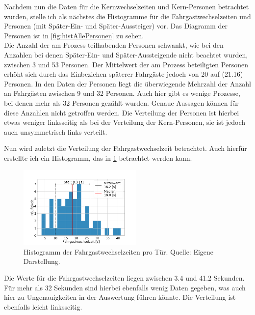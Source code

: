 Nachdem nun die Daten für die Kernwechselzeiten und Kern-Personen betrachtet wurden, stelle ich als nächstes die Histogramme für die Fahrgastwechselzeiten und Personen (mit Später-Ein- und Später-Aussteiger) vor. Das Diagramm der Personen ist in \figurename \ref{fig:histAllePersonen} zu sehen. \\
Die Anzahl der am Prozess teilhabenden Personen schwankt, wie bei den Anzahlen bei denen Später-Ein- und Später-Aussteigende nicht beachtet wurden, zwischen 3 und 53 Personen. Der Mittelwert der am Prozess beteiligten Personen erhöht sich durch das Einbeziehen späterer Fahrgäste jedoch von 20 auf  (21.16) Personen. In den Daten der Personen liegt die überwiegende Mehrzahl der Anzahl an Fahrgästen zwischen 9 und 32 Personen. Auch hier gibt es wenige Prozesse, bei denen mehr als 32 Personen gezählt wurden. Genaue Aussagen können für diese Anzahlen nicht getroffen werden. Die Verteilung der Personen ist hierbei etwas weniger linksseitig als bei der Verteilung der Kern-Personen, sie ist jedoch auch unsymmetrisch links verteilt.

Nun wird zuletzt die Verteilung der Fahrgastwechselzeit betrachtet. Auch hierfür erstellte ich ein Histogramm, das in \figurename \ref{fig:histAllTimes} betrachtet werden kann.
\begin{figure}[H]
	\centering
	\includegraphics[width=0.54\textwidth]{pictures/data_evaluation/transferTime/hist_transfer_times.png}
	\caption{Histogramm der Fahrgastwechselzeiten pro Tür. Quelle: Eigene Darstellung.}
	\label{fig:histAllTimes}
\end{figure}
Die Werte für die Fahrgastwechselzeiten liegen zwischen 3.4 und 41.2 Sekunden. Für mehr als 32 Sekunden sind hierbei ebenfalls wenig Daten gegeben, was auch hier zu Ungenauigkeiten in der Auswertung führen könnte. Die Verteilung ist ebenfalls leicht linksseitig.

